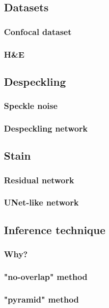 \documentclass[t]{beamer}
\begin{document}
\subsection{Datasets}

\begin{frame}
\frametitle{Confocal dataset}
\end{frame}

\begin{frame}
\frametitle{H\&E}
\end{frame}

\subsection{Despeckling}

\begin{frame}
\frametitle{Speckle noise}
\end{frame}

\begin{frame}
\frametitle{Despeckling network}
\end{frame}

\subsection{Stain}

\begin{frame}
\frametitle{Residual network}
\end{frame}

\begin{frame}
\frametitle{UNet-like network}
\end{frame}

\subsection{Inference technique}

\begin{frame}
\frametitle{Why?}
\end{frame}

\begin{frame}
\frametitle{"no-overlap" method}
\end{frame}

\begin{frame}
\frametitle{"pyramid" method}
\end{frame}
\end{document}
